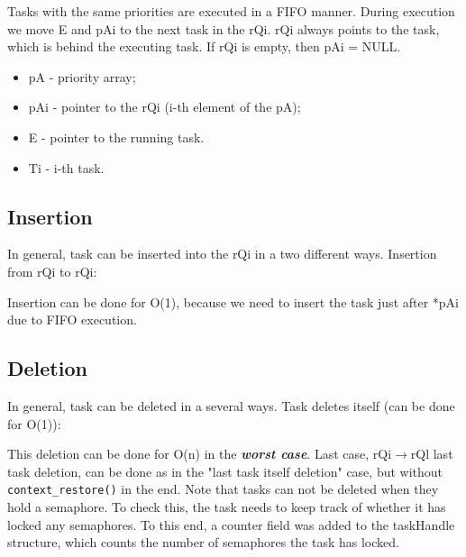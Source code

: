 Tasks with the same priorities are executed in a FIFO manner. During
execution we move E and pAi to the next task in the rQi. rQi always
points to the task, which is behind the executing task. If rQi is empty,
then pAi = NULL.

\begin{itemize}
    \item pA - priority array;
    \item pAi - pointer to the rQi (i-th element of the pA);
    \item E - pointer to the running task.
    \item Ti - i-th task.
\end{itemize}

\subsection{Insertion}

In general, task can be inserted into the rQi in a two different ways.
Insertion from rQi to rQi:

Insertion can be done for O(1), because we need to insert the task just
after *pAi due to FIFO execution.

\subsection{Deletion}

In general, task can be deleted in a several ways. Task deletes itself
(can be done for O(1)):


This deletion can be done for O(n) in the {\textbf{\textit{worst
case}}}. Last case, rQi$\rightarrow$rQl last task deletion, can be done
as in the "last task itself deletion" case, but without {\tt
context\_restore()} in the end. Note that tasks can not be deleted when
they hold a semaphore. To check this, the task needs to keep track of
whether it has locked any semaphores. To this end, a counter field was
added to the taskHandle structure, which counts the number of semaphores
the task has locked.


